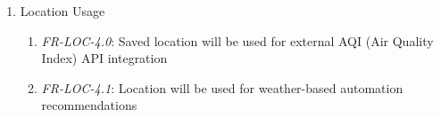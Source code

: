 \documentclass[conference]{IEEEtran}
\begin{document}
\begin{enumerate}
\begin{enumerate}
                            \item \textit{FR-LOC-3.3}: If user taps back button without saving, show warning: "Discard changes?"
                            \item \textit{FR-LOC-3.4}: Location data should include: city name, country, latitude, longitude
                        \end{enumerate}
                    \item Location Usage
                        \begin{enumerate}
                            \item \textit{FR-LOC-4.0}: Saved location will be used for external AQI (Air Quality Index) API integration
                            \item \textit{FR-LOC-4.1}: Location will be used for weather-based automation recommendations
                        \end{enumerate}
                \end{enumerate}
\end{document}

